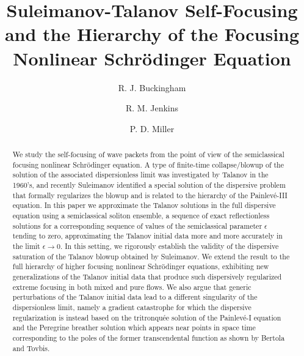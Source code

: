 \documentclass[12pt]{amsart}
\title{Suleimanov-Talanov Self-Focusing and the Hierarchy of the Focusing Nonlinear Schr\"odinger Equation}
\author{R. J. Buckingham}
\author{R. M. Jenkins}
\author{P. D. Miller}
\numberwithin{equation}{section}
\begin{document}
\begin{abstract}
We study the self-focusing of wave packets from the point of view of the semiclassical focusing nonlinear Schr\"odinger 
equation.  A type of finite-time collapse/blowup of the solution of the associated dispersionless limit was investigated by 
Talanov in the 1960's, and recently Suleimanov identified a special solution of the dispersive problem that formally 
regularizes the blowup and is related to the hierarchy of the Painlev\'e-III equation.  In this paper we approximate 
the Talanov solutions in the full dispersive equation using a semiclassical soliton ensemble, a sequence of exact 
reflectionless solutions for a corresponding sequence of values of the semiclassical parameter $\epsilon$ tending to zero, 
approximating the Talanov initial data more and more accurately in the limit $\epsilon\to 0$.  In this setting, we 
rigorously establish the validity of the dispersive saturation of the Talanov blowup obtained by Suleimanov.  We extend the 
result to the full hierarchy of higher focusing nonlinear Schr\"odinger equations, exhibiting new generalizations of the 
Talanov initial data that produce such dispersively regularized extreme focusing in both mixed and pure flows.  We also 
argue that generic perturbations of the Talanov initial data lead to a different singularity of the dispersionless limit, 
namely a gradient catastrophe for which the dispersive regularization is instead based on the tritronqu\'ee solution of the 
Painlev\'e-I equation and the Peregrine breather solution which appears near points in space time corresponding to the 
poles of the former transcendental function as shown by Bertola and Tovbis.  
\vspace{-.4in}
\end{abstract}
\maketitle

{\small\tableofcontents}

\end{document}
